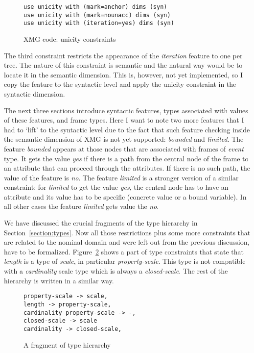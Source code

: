 \begin{figure}
\begin{verbatim}
use unicity with (mark=anchor) dims (syn)
use unicity with (mark=nounacc) dims (syn)
use unicity with (iteration=yes) dims (syn)
\end{verbatim}
\caption{XMG code: unicity constraints \label{xmg:unicity}}
\end{figure}

The third constraint restricts the appearance of the \textit{iteration} feature to one per tree. The nature of this constraint is semantic and the natural way would be to locate it in the semantic dimension. This is, however, not yet implemented, so I copy the feature to the syntactic level and apply the unicity constraint in the syntactic dimension.

The next three sections introduce syntactic features, types associated with values of these features, and frame types. Here I want to note two more features that I had to `lift' to the syntactic level due to the fact that such feature checking inside the semantic dimension of XMG is not yet supported: \textit{bounded} and \textit{limited}. The feature \textit{bounded} appears at those nodes that are associated with frames of \textit{event} type. It gets the value \textit{yes} if there is a path from the central node of the frame to an attribute \FIN that can proceed through the \PARTOF attributes. If there is no such path, the value of the feature is \textit{no}. The feature \textit{limited} is a stronger version of a similar constraint: for \textit{limited} to get the value \textit{yes}, the central node has to have an attribute \FIN and its value has to be specific (concrete value or a bound variable). In all other cases the feature \textit{limited} gets value the \textit{no}.

We have discussed the crucial fragments of the type hierarchy in Section~\ref{section:types}. Now all those restrictions plus some more constraints that are related to the nominal domain and were left out from the previous discussion, have to be formalized. Figure~\ref{xmg:types} shows a part of type constraints that state that \textit{length} is a type of \textit{scale}, in particular \textit{property-scale}. This type is not compatible with a \textit{cardinality} scale type which is always a \textit{closed-scale}. The rest of the hierarchy is written in a similar way.

\begin{figure}
\begin{verbatim}
property-scale -> scale,
length -> property-scale,
cardinality property-scale -> -,
closed-scale -> scale
cardinality -> closed-scale,
\end{verbatim}
\caption{A fragment of type hierarchy \label{xmg:types}}
\end{figure}

